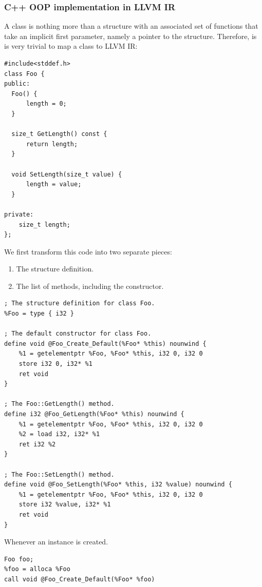 \documentclass[a4paper]{exam}
\theoremstyle{definition}
\begin{document}
\subsubsection{C++ OOP implementation in LLVM IR\cite{llvmcpp}}
A class is nothing more than a structure with an associated set of functions that take an implicit first parameter, namely a pointer to the structure. Therefore, is is very trivial to map a class to LLVM IR:
\begin{verbatim}
#include<stddef.h>
class Foo {
public:
  Foo() {
      length = 0;
  }

  size_t GetLength() const {
      return length;
  }

  void SetLength(size_t value) {
      length = value;
  }

private:
    size_t length;
};
\end{verbatim}
We first transform this code into two separate pieces:
\begin{enumerate}
 \item The structure definition.
 \item The list of methods, including the constructor.
\end{enumerate}
\begin{verbatim}
; The structure definition for class Foo.
%Foo = type { i32 }

; The default constructor for class Foo.
define void @Foo_Create_Default(%Foo* %this) nounwind {
    %1 = getelementptr %Foo, %Foo* %this, i32 0, i32 0
    store i32 0, i32* %1
    ret void
}

; The Foo::GetLength() method.
define i32 @Foo_GetLength(%Foo* %this) nounwind {
    %1 = getelementptr %Foo, %Foo* %this, i32 0, i32 0
    %2 = load i32, i32* %1
    ret i32 %2
}

; The Foo::SetLength() method.
define void @Foo_SetLength(%Foo* %this, i32 %value) nounwind {
    %1 = getelementptr %Foo, %Foo* %this, i32 0, i32 0
    store i32 %value, i32* %1
    ret void
}
\end{verbatim}
Whenever an instance is created.
\begin{verbatim}
Foo foo;
%foo = alloca %Foo
call void @Foo_Create_Default(%Foo* %foo)
\end{verbatim}
\end{document}
